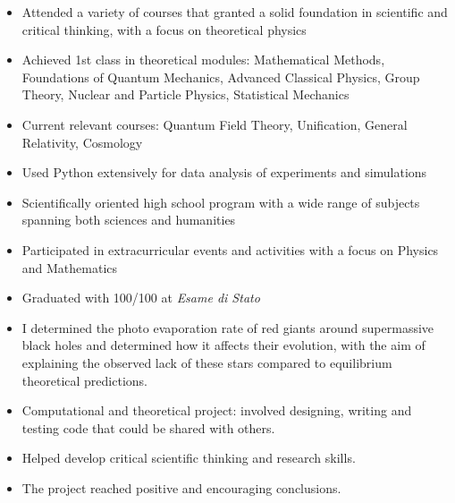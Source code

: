 \documentclass{res}[12pt] %
\begin{document}
\begin{resume}
\begin{itemize} \itemsep -2pt
\item Attended a variety of courses that granted a solid foundation in scientific and critical thinking, with a focus on theoretical physics
\item Achieved 1st class in theoretical modules: Mathematical Methods, Foundations of Quantum Mechanics, Advanced Classical Physics, Group Theory, Nuclear and Particle Physics, Statistical Mechanics
\item Current relevant courses: Quantum Field Theory, Unification, General Relativity, Cosmology
\item Used Python extensively for data analysis of experiments and simulations
\end{itemize}

\begin{itemize} \itemsep -2pt
\item Scientifically oriented high school program with a wide range of subjects spanning both sciences and humanities
\item Participated in extracurricular events and activities with a focus on Physics and Mathematics
\item Graduated with 100/100 at \sl{Esame di Stato}
\end{itemize}


 


\sectionRule
\vspace{6pt} %

\begin{itemize}
\item I determined the photo evaporation rate of red giants around supermassive black holes and determined how it affects their evolution, with the aim of explaining the observed lack of these stars compared to equilibrium theoretical predictions.
\item Computational and theoretical project: involved designing, writing and testing code that could be shared with others.
\item Helped develop critical scientific thinking and research skills.
\item The project reached positive and encouraging conclusions.
\end{itemize}


\end{resume}
\end{document}
